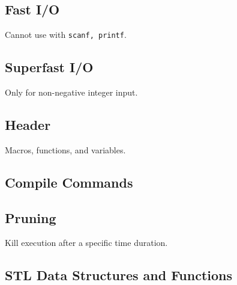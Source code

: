 \documentclass{article}
\begin{document}
\subsection{Fast I/O}
Cannot use with \verb|scanf, printf|.


\subsection{Superfast I/O}
Only for non-negative integer input.


\subsection{Header}
Macros, functions, and variables.


\subsection{Compile Commands}


\subsection{Pruning}
Kill execution after a specific time duration.


\subsection{STL Data Structures and Functions}

\end{document}
